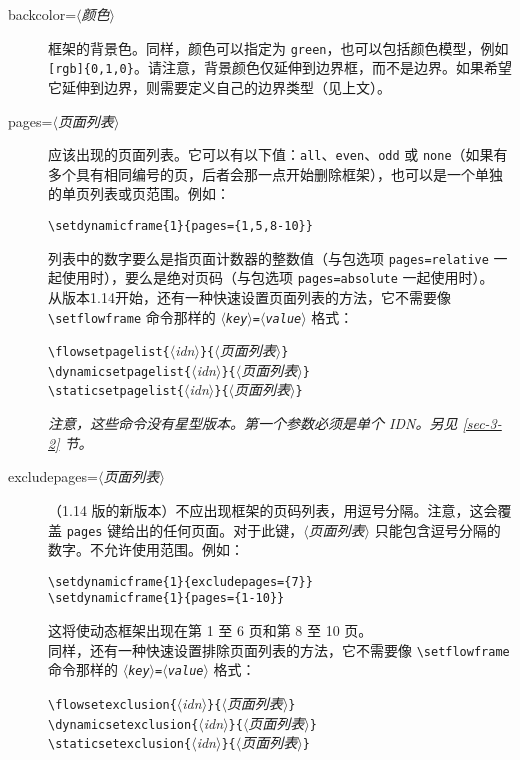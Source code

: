 \documentclass[a4paper]{book}%
\newcommand{\meta}[1]{\textnormal{\ensuremath{\langle}\makebox[0pt][l]{}\emph{#1}\makebox[0pt][l]{}\ensuremath{\rangle}}}
\newcommand{\cmd}[1]{\texttt{#1}}
\begin{document}
\begin{description}
    \item[backcolor=\meta{颜色}] 框架的背景色。同样，颜色可以指定为 \verb|green|，也可以包括颜色模型，例如 \verb|[rgb]{0,1,0}|。请注意，背景颜色仅延伸到边界框，而不是边界。如果希望它延伸到边界，则需要定义自己的边界类型（见上文）。
    \item[pages=\meta{页面列表}] 应该出现的页面列表。它可以有以下值：\verb|all|、\verb|even|、\verb|odd| 或 \verb|none|（如果有多个具有相同编号的页，后者会那一点开始删除框架），也可以是一个单独的单页列表或页范围。例如：
    \begin{mdframed}[backgroundcolor=white]
        \verb|\setdynamicframe{1}{pages={1,5,8-10}}|
    \end{mdframed}
    列表中的数字要么是指页面计数器的整数值（与包选项 \cmd{pages=relative} 一起使用时），要么是绝对页码（与包选项 \cmd{pages=absolute} 一起使用时）。\\
    从版本1.14开始，还有一种快速设置页面列表的方法，它不需要像 \verb|\setflowframe| 命令那样的 \cmd{\meta{key}=\meta{value}} 格式：
    \begin{mdframed}
        \verb|\flowsetpagelist{|\meta{idn}\verb|}{|\meta{页面列表}\verb|}|\\
        \verb|\dynamicsetpagelist{|\meta{idn}\verb|}{|\meta{页面列表}\verb|}|\\
        \verb|\staticsetpagelist{|\meta{idn}\verb|}{|\meta{页面列表}\verb|}|
    \end{mdframed}
    \emph{注意，这些命令没有星型版本。第一个参数必须是单个 IDN。另见 \ref{sec-3-2} 节。}
    \item[excludepages=\meta{页面列表}] （1.14 版的新版本）不应出现框架的页码列表，用逗号分隔。注意，这会覆盖 \cmd{pages} 键给出的任何页面。对于此键，\meta{页面列表} 只能包含逗号分隔的数字。不允许使用范围。例如：
\begin{lstlisting}[backgroundcolor=\color{white}]
\setdynamicframe{1}{excludepages={7}}
\setdynamicframe{1}{pages={1-10}}
\end{lstlisting}
    这将使动态框架出现在第 1 至 6 页和第 8 至 10 页。\\
    同样，还有一种快速设置排除页面列表的方法，它不需要像 \verb|\setflowframe| 命令那样的 \cmd{\meta{key}=\meta{value}} 格式：
    \begin{mdframed}
        \verb|\flowsetexclusion{|\meta{idn}\verb|}{|\meta{页面列表}\verb|}|\\
        \verb|\dynamicsetexclusion{|\meta{idn}\verb|}{|\meta{页面列表}\verb|}|\\
        \verb|\staticsetexclusion{|\meta{idn}\verb|}{|\meta{页面列表}\verb|}|

\end{mdframed}
\end{description}
\end{document}
